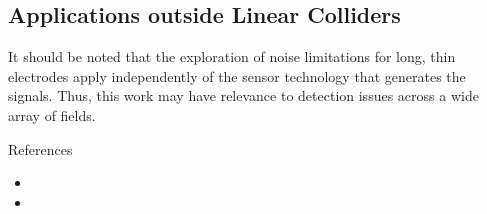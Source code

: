 \documentclass[12pt]{report}
\begin{document}
\subsection{Applications outside Linear Colliders}

It should be noted that the exploration of noise limitations for long, thin electrodes apply independently
of the sensor technology that generates the signals. Thus, this work may have
relevance to detection issues across a wide array of fields.


References
\begin{itemize}
\item {}
\item {}
\end{itemize}
\end{document}
